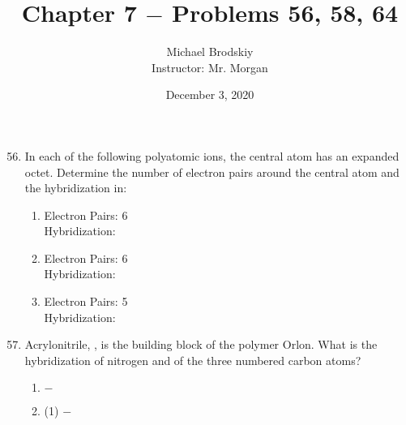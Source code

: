 \documentclass[12pt]{article}
\title{Chapter 7 $-$ Problems 56, 58, 64}
\date{December 3, 2020}
\author{Michael Brodskiy\\ \small Instructor: Mr. Morgan}
\begin{document}
\maketitle

\begin{enumerate}

    \setcounter{enumi}{55}

  \item In each of the following polyatomic ions, the central atom has an expanded octet. Determine the number of electron pairs around the central atom and the hybridization in:

    \begin{enumerate}

      \item {}

        \begin{center}
          Electron Pairs: 6\\
          Hybridization: 
        \end{center}

      \item {}

        \begin{center}
          Electron Pairs: 6\\
          Hybridization: 
        \end{center}

      \item {}

        \begin{center}
          Electron Pairs: 5\\
          Hybridization: 
        \end{center}

    \end{enumerate}

    \setcounter{enumi}{57}

  \item Acrylonitrile, , is the building block of the polymer Orlon. What is the hybridization of nitrogen and of the three numbered carbon atoms?

    \begin{enumerate}

      \item {} $-$ 

      \item {} (1) $-$ 


\end{enumerate}
\end{enumerate}
\end{document}
